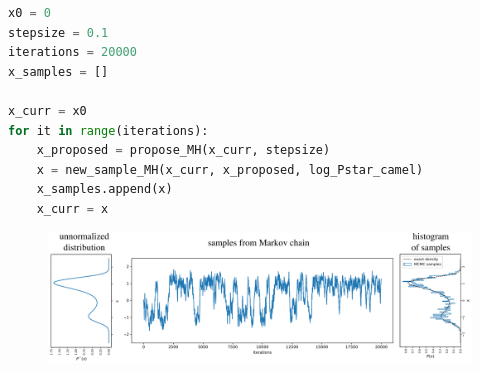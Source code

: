 \begin{enumerate}
\begin{itemize}
\begin{lstlisting}[language=python]
x0 = 0
stepsize = 0.1
iterations = 20000
x_samples = []

x_curr = x0
for it in range(iterations):
    x_proposed = propose_MH(x_curr, stepsize)
    x = new_sample_MH(x_curr, x_proposed, log_Pstar_camel)
    x_samples.append(x)
    x_curr = x
\end{lstlisting}
\end{itemize}

\begin{figure}[h]
\centering
	\includegraphics[width=1.1\textwidth]{./figs/07-camel-MH.pdf}
\end{figure}
\end{enumerate}





